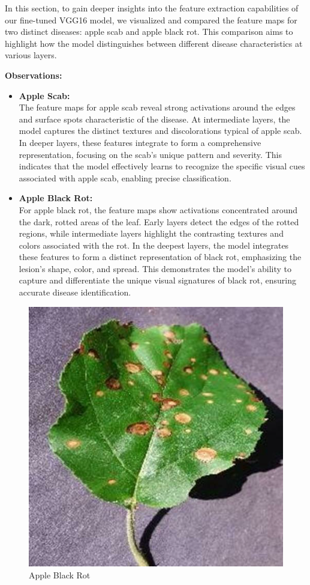 In this section, to gain deeper insights into the feature extraction capabilities of our fine-tuned VGG16 model, we visualized and compared the feature maps for two distinct diseases: apple scab and apple black rot. This comparison aims to highlight how the model distinguishes between different disease characteristics at various layers. \par\vspace{1em}

\textbf{Observations: }\\
\begin{itemize}
    \item \textbf{Apple Scab:}\\
    The feature maps for apple scab reveal strong activations around the edges and surface spots characteristic of the disease. At intermediate layers, the model captures the distinct textures and discolorations typical of apple scab. In deeper layers, these features integrate to form a comprehensive representation, focusing on the scab's unique pattern and severity. This indicates that the model effectively learns to recognize the specific visual cues associated with apple scab, enabling precise classification.
    \item \textbf{Apple Black Rot:}\\
    For apple black rot, the feature maps show activations concentrated around the dark, rotted areas of the leaf. Early layers detect the edges of the rotted regions, while intermediate layers highlight the contrasting textures and colors associated with the rot. In the deepest layers, the model integrates these features to form a distinct representation of black rot, emphasizing the lesion's shape, color, and spread. This demonstrates the model's ability to capture and differentiate the unique visual signatures of black rot, ensuring accurate disease identification.
\end{itemize}


\begin{figure}
    \centering
    \includegraphics[width=0.5\linewidth]{graphics//chapter7/abr2.png}
    \caption{Apple Black Rot}
    \label{fig:abr-2}
\end{figure}

